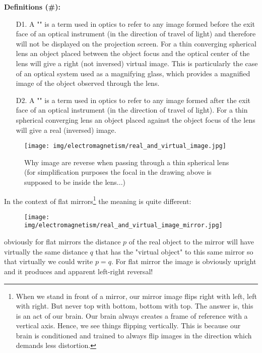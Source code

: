 	\textbf{Definitions (\#\mydef):}
	\begin{enumerate}
		\item[D1.] A "" is a term used in optics to refer to any image formed before the exit face of an optical instrument (in the direction of travel of light) and therefore will not be displayed on the projection screen. For a thin converging spherical lens an object placed between the object focus and the optical center of the lens will give a right (not inversed) virtual image. This is particularly the case of an optical system used as a magnifying glass, which provides a magnified image of the object observed through the lens.

		\item[D2.] A "" is a term used in optics to refer to any image formed after the exit face of an optical instrument (in the direction of travel of light). For a thin spherical converging lens an object placed against the object focus of the lens will give a real (inversed) image.
	\end{enumerate}
	\begin{figure}[H]
		\centering
		\texttt{[image: img/electromagnetism/real\_and\_virtual\_image.jpg]}
		\caption{Why image are reverse when passing through a thin spherical lens (for simplification purposes the focal in the drawing above is supposed to be inside the lens...)}
	\end{figure}
	In the context of flat mirrors\footnote{When we stand in front of a mirror, our mirror image flips right with left, left with right. But never top with bottom, bottom with top. The answer is, this is an act of our brain. Our brain always creates a frame of reference with a vertical axis. Hence, we see things flipping vertically. This is because our brain is conditioned and trained to always flip images in the direction which demands less distortion.} the meaning is quite different:
	\begin{figure}[H]
		\centering
		\texttt{[image: img/electromagnetism/real\_and\_virtual\_image\_mirror.jpg]}
	\end{figure}
	obviously for flat mirrors the distance $p$ of the real object to the mirror will have virtually the same distance $q$ that has the "virtual object" to this same mirror so that virtually we could write $p=q$. For flat mirror the image is obviously upright and it produces and apparent left-right reversal!
	
